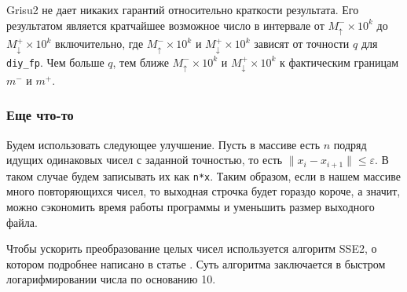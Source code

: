 \documentclass[specialist,subf,href,colorlinks=true,14pt
,times,mtpro,specialist
]{disser}
\begin{document}
\textsf{Grisu2} не дает никаких гарантий относительно краткости результата. 
Его результатом является кратчайшее возможное число в интервале от $M_\uparrow^- \times 10^k$ до $M_\downarrow^+ \times 10^k$ включительно, где $M_\uparrow^- \times 10^k$ и $M_\downarrow^+ \times 10^k$  зависят от точности $q$ для \texttt{diy\_fp}.
Чем больше $q$, тем ближе $M_\uparrow^- \times 10^k$ и $M_\downarrow^+ \times 10^k$ к фактическим границам $m^-$ и $m^+$. 

\subsubsection{Еще что-то}
Будем использовать следующее улучшение.
Пусть в массиве есть $n$ подряд идущих одинаковых чисел с заданной точностью, то есть $\|x_i - x_{i+1}\| \leqslant \varepsilon$.
В таком случае будем записывать их как \texttt{n*x}.
Таким образом, если в нашем массиве много повторяющихся чисел, то выходная строчка будет гораздо короче, а значит, можно сэкономить время работы программы и уменьшить размер выходного файла.

Чтобы ускорить преобразование целых чисел используется алгоритм \textsf{SSE2}, о котором подробнее написано в статье \cite{2}.
Суть алгоритма заключается в быстром логарифмировании числа по основанию 10.
\end{document}
